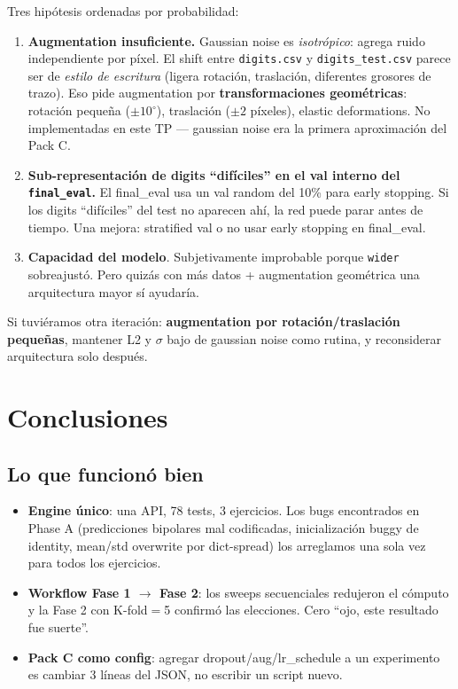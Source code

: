 \documentclass[11pt,a4paper]{article}
\newcommand{\code}[1]{\texttt{\textcolor{accent}{#1}}}
\begin{document}
Tres hipótesis ordenadas por probabilidad:

\begin{enumerate}[leftmargin=1.4em, itemsep=4pt]
  \item \textbf{Augmentation insuficiente.} Gaussian noise es \emph{isotrópico}: agrega ruido independiente por píxel. El shift entre \code{digits.csv} y \code{digits\_test.csv} parece ser de \emph{estilo de escritura} (ligera rotación, traslación, diferentes grosores de trazo). Eso pide augmentation por \textbf{transformaciones geométricas}: rotación pequeña ($\pm 10^\circ$), traslación ($\pm 2$ píxeles), elastic deformations. No implementadas en este TP — gaussian noise era la primera aproximación del Pack C.
  \item \textbf{Sub-representación de digits ``difíciles'' en el val interno del \texttt{final\_eval}.} El final\_eval usa un val random del 10\% para early stopping. Si los digits ``difíciles'' del test no aparecen ahí, la red puede parar antes de tiempo. Una mejora: stratified val o no usar early stopping en final\_eval.
  \item \textbf{Capacidad del modelo}. Subjetivamente improbable porque \code{wider} sobreajustó. Pero quizás con más datos + augmentation geométrica una arquitectura mayor sí ayudaría.
\end{enumerate}

\begin{takeaway}
Si tuviéramos otra iteración: \textbf{augmentation por rotación/traslación pequeñas}, mantener L2 y \(\sigma\) bajo de gaussian noise como rutina, y reconsiderar arquitectura solo después.
\end{takeaway}

\section{Conclusiones}

\subsection{Lo que funcionó bien}
\begin{itemize}[leftmargin=1.4em, itemsep=2pt]
  \item \textbf{Engine único}: una API, 78 tests, 3 ejercicios. Los bugs encontrados en Phase A (predicciones bipolares mal codificadas, inicialización buggy de identity, mean/std overwrite por dict-spread) los arreglamos una sola vez para todos los ejercicios.
  \item \textbf{Workflow Fase 1 \(\to\) Fase 2}: los sweeps secuenciales redujeron el cómputo y la Fase 2 con K-fold$=$5 confirmó las elecciones. Cero ``ojo, este resultado fue suerte''.
  \item \textbf{Pack C como config}: agregar dropout/aug/lr\_schedule a un experimento es cambiar 3 líneas del JSON, no escribir un script nuevo.
\end{itemize}
\end{document}
